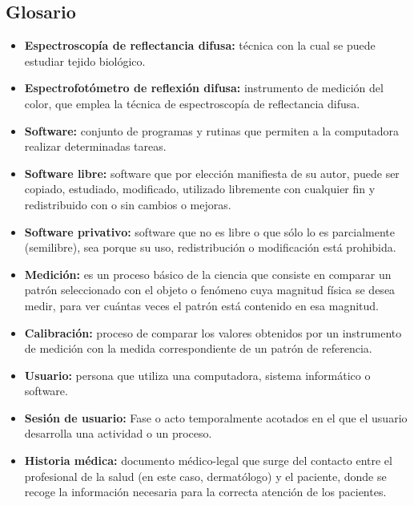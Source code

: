 \subsection{Glosario}

\begin{itemize}
	
	\item \textbf{Espectroscop\'{i}a de reflectancia difusa:}  t\'{e}cnica con la cual se puede estudiar tejido biol\'{o}gico.

	\item \textbf{Espectrofot\'{o}metro de reflexi\'{o}n difusa:} instrumento de medici\'{o}n del color, que emplea la t\'{e}cnica de espectroscop\'{i}a de reflectancia difusa.
	
	\item \textbf{Software:} conjunto de programas y rutinas que permiten a la computadora realizar determinadas tareas.
	
	\item \textbf{Software libre:} software que por elecci\'{o}n manifiesta de su autor, puede ser copiado, estudiado, modificado, utilizado libremente con cualquier fin y redistribuido con o sin cambios o mejoras.
	
	\item \textbf{Software privativo:} software que no es libre o que s\'{o}lo lo es parcialmente (semilibre), sea porque su uso, redistribuci\'{o}n o modificaci\'{o}n est\'{a} prohibida.
	
	\item \textbf{Medici\'{o}n:} es un proceso b\'{a}sico de la ciencia que consiste en comparar un patr\'{o}n seleccionado con el objeto o fen\'{o}meno cuya magnitud f\'{i}sica se desea medir, para ver cu\'{a}ntas veces el patr\'{o}n est\'{a} contenido en esa magnitud.
	
	\item \textbf{Calibraci\'{o}n:} proceso de comparar los valores obtenidos por un instrumento de medici\'{o}n con la medida correspondiente de un patr\'{o}n de referencia.
	
	\item \textbf{Usuario:} persona que utiliza una computadora, sistema inform\'{a}tico o software.
	
	\item \textbf{Sesi\'{o}n de usuario:} Fase o acto temporalmente acotados en el que el usuario desarrolla una actividad o un proceso.
	
	\item \textbf{Historia m\'{e}dica:} documento m\'{e}dico-legal que surge del contacto entre el profesional de la salud (en este caso, dermat\'{o}logo) y el paciente, donde se recoge la informaci\'{o}n necesaria para la correcta atenci\'{o}n de los pacientes.
	

\end{itemize}
